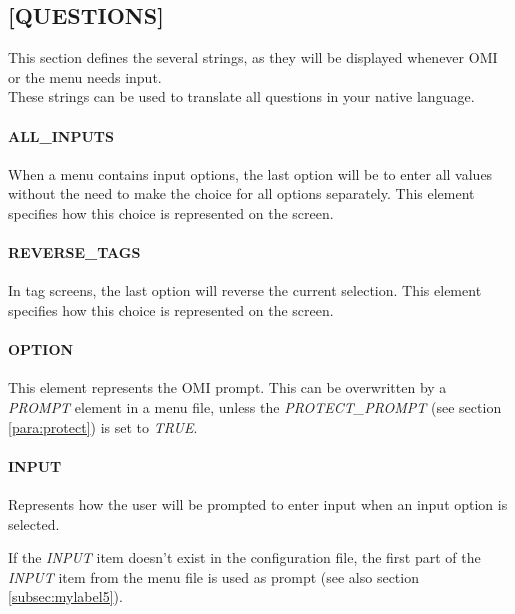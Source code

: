 \documentclass[a4paper]{book}
\begin{document}
\subsection{[QUESTIONS]}
\label{subsubsec:mylabel18}

This section defines the several strings, as they will be displayed whenever 
OMI or the menu needs input. \\
These strings can be used to translate all questions in your native 
language.

\paragraph{ALL{\_}INPUTS}
\label{para:mylabel3}

When a menu contains input options, the last option will be to enter all 
values without the need to make the choice for all options separately. This 
element specifies how this choice is represented on the screen.

\paragraph{REVERSE{\_}TAGS}

In tag screens, the last option will reverse the current selection. This 
element specifies how this choice is represented on the screen.

\paragraph{OPTION}
\label{para:option}

This element represents the OMI prompt. This can be overwritten by a 
\textsl{PROMPT} element in a menu file, unless the \textsl{PROTECT{\_}PROMPT} (see section 
\ref{para:protect}) is set to \textsl{TRUE}.

\paragraph{INPUT}
\label{para:input}

Represents how the user will be prompted to enter input when an input option 
is selected.

If the \textsl{INPUT} item doesn't exist in the configuration file, the first part of the \textsl{INPUT}
item from the menu file is used as prompt (see also section \ref{subsec:mylabel5}).
\end{document}
